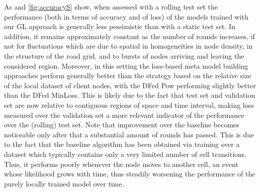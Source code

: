 As  and \ref{fig:accuracyS} show, when assessed with a rolling test set the performance (both in terms of accuracy and of loss) of the models trained with our GL approach is generally less pessimistic than with a static test set. In addition, it remains approximately constant as the number of rounds increases, if not for fluctuations which are due to spatial in homogeneities in node density, in the structure of the road grid, and to bursts of nodes arriving and leaving the considered region. Moreover, in this setting the loss-based meta model building approaches perform generally better than the strategy based on the relative size of the local dataset of client nodes, with the DFed Pow performing slightly better than the DFed MinLoss. This is likely due to the fact that test set and validation set are now relative to contiguous regions of space and time interval, making loss measured over the validation set a more relevant indicator of the performance over the (rolling) test set. Note that improvement over the baseline becomes noticeable only after that a substantial amount of rounds has passed. This is due to the fact that the baseline algorithm has been obtained via training over a dataset which typically contains only a very limited number of cell transitions. Thus, it performs poorly whenever the node moves to another cell, an event whose likelihood grows with time, thus steadily worsening the performance of the purely locally trained model over time.  
